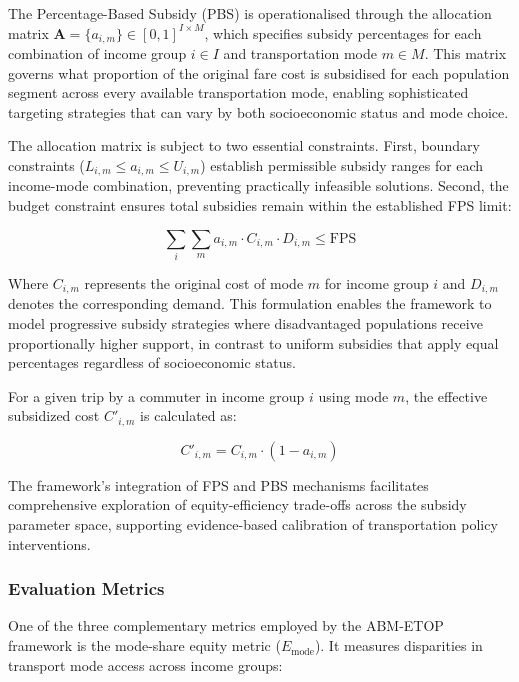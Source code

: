 \documentclass[a4paper,fleqn]{cas-sc}
\begin{document}
The Percentage-Based Subsidy (PBS) is operationalised through the allocation matrix $\mathbf{A} = \{a_{i,m}\} \in [0,1]^{I \times M}$, which specifies subsidy percentages for each combination of income group $i \in I$ and transportation mode $m \in M$. This matrix governs what proportion of the original fare cost is subsidised for each population segment across every available transportation mode, enabling sophisticated targeting strategies that can vary by both socioeconomic status and mode choice.

The allocation matrix is subject to two essential constraints. First, boundary constraints ($L_{i,m} \leq a_{i,m} \leq U_{i,m}$) establish permissible subsidy ranges for each income-mode combination, preventing practically infeasible solutions. Second, the budget constraint ensures total subsidies remain within the established FPS limit:

\begin{equation}
\sum_{i}\sum_{m}a_{i,m} \cdot C_{i,m} \cdot D_{i,m} \leq \text{FPS}
\end{equation}

Where $C_{i,m}$ represents the original cost of mode $m$ for income group $i$ and $D_{i,m}$ denotes the corresponding demand. This formulation enables the framework to model progressive subsidy strategies where disadvantaged populations receive proportionally higher support, in contrast to uniform subsidies that apply equal percentages regardless of socioeconomic status.

For a given trip by a commuter in income group $i$ using mode $m$, the effective subsidized cost $C'_{i,m}$ is calculated as:

\begin{equation}
C'_{i,m} = C_{i,m} \cdot (1 - a_{i,m})
\end{equation}

The framework's integration of FPS and PBS mechanisms facilitates comprehensive exploration of equity-efficiency trade-offs across the subsidy parameter space, supporting evidence-based calibration of transportation policy interventions.

\subsubsection{Evaluation Metrics}\label{sec:metricequations}

One of the three complementary metrics employed by the ABM-ETOP framework is the mode-share equity metric ($E_{\text{mode}}$). It measures disparities in transport mode access across income groups:
\end{document}
